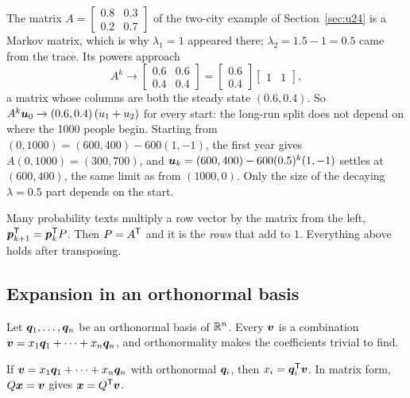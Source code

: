 \begin{example}\label{ex:u26-twocity}
The matrix $A=\left[\begin{smallmatrix} 0.8&0.3\\ 0.2&0.7\end{smallmatrix}\right]$ of
the two-city example of Section~\ref{sec:u24} is a Markov matrix, which is why $\lambda_1=1$ appeared there;
$\lambda_2=1.5-1=0.5$ came from the trace. Its powers approach
\[
  A^{k}\to\begin{bmatrix} 0.6&0.6\\ 0.4&0.4\end{bmatrix}
  =\begin{bmatrix} 0.6\\ 0.4\end{bmatrix}\begin{bmatrix} 1&1\end{bmatrix},
\]
a matrix whose columns are both the steady state $(0.6,0.4)$. So
$A^{k}\boldsymbol{u}_0\to(0.6,0.4)\,(u_1+u_2)$ for every start: the long-run split does not depend on
where the 1000 people begin. Starting from $(0,1000)=(600,400)-600(1,-1)$, the first year
gives $A(0,1000)=(300,700)$, and
$\boldsymbol{u}_k=(600,400)-600(0.5)^{k}(1,-1)$ settles at $(600,400)$, the same limit as from
$(1000,0)$. Only the size of the decaying $\lambda=0.5$ part depends on the start.
\end{example}

\begin{remark}
Many probability texts multiply a row vector by the matrix from the left, $\boldsymbol{p}_{k+1}^{\mathsf{T}}=\boldsymbol{p}_k^{\mathsf{T}} P$.
Then $P=A^{\mathsf{T}}$ and it is the \emph{rows} that add to $1$. Everything above holds after
transposing.
\end{remark}

\subsection{Expansion in an orthonormal basis}

Let $\boldsymbol{q}_1,\dots,\boldsymbol{q}_n$ be an orthonormal basis of $\mathbb{R}^{n}$. Every $\boldsymbol{v}$ is a
combination $\boldsymbol{v}=x_1\boldsymbol{q}_1+\dots+x_n\boldsymbol{q}_n$, and orthonormality makes the coefficients
trivial to find.

\begin{proposition}\label{prop:u26-coeff}
If $\boldsymbol{v}=x_1\boldsymbol{q}_1+\dots+x_n\boldsymbol{q}_n$ with orthonormal $\boldsymbol{q}_i$, then
$x_i=\boldsymbol{q}_i^{\mathsf{T}}\boldsymbol{v}$. In matrix form, $Q\boldsymbol{x}=\boldsymbol{v}$ gives $\boldsymbol{x}=Q^{\mathsf{T}}\boldsymbol{v}$.
\end{proposition}

